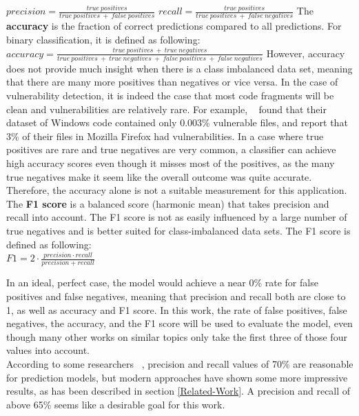 \documentclass[
a4paper,
pagesize,
pdftex,
12pt,
twoside, %
BCOR=5mm, %
ngerman,
fleqn,
final,
]{scrartcl}
\begin{document}
	\mbox{}\newline
	$precision = \frac{true~positives}{true~positives~+~false~positives}$\newline
	\mbox{}\newline
	$recall = \frac{true~positives}{true~positives~+~false~negatives}$\newline
	\mbox{}\newline
	The \textbf{accuracy} is the fraction of correct predictions compared to all predictions. For binary classification, it is defined as following:  \newline
	\mbox{}\newline
	$accuracy = \frac{true~positives~+~true~negatives}{true~positives~+~true~negatives~+~false~positives~+~false~negatives}$\newline
	\mbox{}\newline
	However, accuracy does not provide much insight when there is a class imbalanced data set, meaning that there are many more positives than negatives or vice versa. In the case of vulnerability detection, it is indeed the case that most code fragments will be clean and vulnerabilities are relatively rare. For example, ~\cite{Morrison.2015} found that their dataset of Windows code contained only 0.003\% vulnerable files, and \cite{Shin.2010} report that 3\% of their files in Mozilla Firefox had vulnerabilities. In a case where true positives are rare and true negatives are very common, a classifier can achieve high accuracy scores even though it misses most of the positives, as the many true negatives make it seem like the overall outcome was quite accurate. Therefore, the accuracy alone is not a suitable measurement for this application.\\
	The \textbf{F1 score} is a balanced score (harmonic mean) that takes precision and recall into account. The F1 score is not as easily influenced by a large number of true negatives and is better suited for class-imbalanced data sets. The F1 score is defined as following:\\
	\mbox{}\newline
	$F1 = 2 \cdot \frac{precision \cdot recall}{precision + recall}$
	\mbox{}\newline
	
	In an ideal, perfect case, the model would achieve a near 0\% rate for false positives and false negatives, meaning that precision and recall both are close to 1, as well as accuracy and F1 score. In this work, the rate of false positives, false negatives, the accuracy, and the F1 score will be used to evaluate the model, even though many other works on similar topics only take the first three of those four values into account.\\
	According to some researchers ~\cite{Morrison.2015,Shin.2013,Neuhaus.2007}, precision and recall values of 70\% are reasonable for prediction models, but modern approaches have shown some more impressive results, as has been described in section \ref{Related-Work}. A precision and recall of above 65\% seems like a desirable goal for this work.
	
\end{document}
